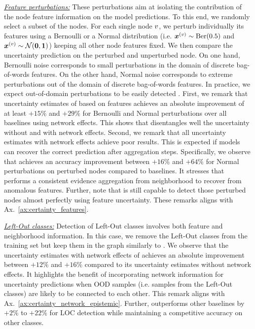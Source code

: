 \textit{\underline{Feature perturbations:}} These perturbations aim at isolating the contribution of the node feature information on the model predictions. To this end, we randomly select a subset of the nodes. For each single node $v$, we perturb individually its features using a Bernoulli or a Normal distribution (i.e. $\bm{x}^{(v)} \sim \operatorname{Ber}(0.5)$ and $\bm{x}^{(v)} \sim \operatorname{\mathcal{N}}(\bm{0}, \bm{1})$) keeping all other node features fixed. We then compare the uncertainty prediction on the perturbed and unperturbed node. On one hand, Bernoulli noise corresponds to small perturbations in the domain of discrete bag-of-words features. On the other hand, Normal noise corresponds to extreme perturbations out of the domain of discrete bag-of-words features. In practice, we expect out-of-domain perturbations to be easily detected \citep{charpentier2020}. First, we remark that uncertainty estimates of \GPNacro{} based on features achieves an absolute improvement of at least $+15\%$ and $+29\%$ for Bernoulli and Normal perturbations over all baselines using network effects. This shows that \GPNacro{} disentangles well the uncertainty without and with network effects. Second, we remark that all uncertainty estimates with network effects achieve poor results. This is expected if models can recover the correct prediction after aggregation steps. Specifically, we observe that \GPNacro{} achieves an accuracy improvement between $+16\%$ and $+64\%$ for Normal perturbations on perturbed nodes compared to baselines. It stresses that \GPNacro{} performs a consistent evidence aggregation from neighborhood to recover from anomalous features. Further, note that \GPNacro{} is still capable to detect those perturbed nodes almost perfectly using feature uncertainty. These remarks aligns with Ax.~\ref{ax:certainty_features}. 


\textit{\underline{Left-Out classes:}} Detection of Left-Out classes involves both feature and neighborhood information. In this case, we remove the Left-Out classes from the training set but keep them in the graph similarly to \citep{Zhao2020}. We observe that the uncertainty estimates with network effects of \GPNacro{} achieves an absolute improvement between $+12\%$ and $+16\%$ compared to its uncertainty estimates without network effects. It highlights the benefit of incorporating network information for uncertainty predictions when OOD samples (i.e. samples from the Left-Out classes) are likely to be connected to each other. This remark aligns with Ax.~\ref{ax:certainty_network_epistemic}. Further, \GPNacro{} outperforms other baselines by $+2\%$ to $+22\%$ for LOC detection while maintaining a competitive accuracy on other classes.

